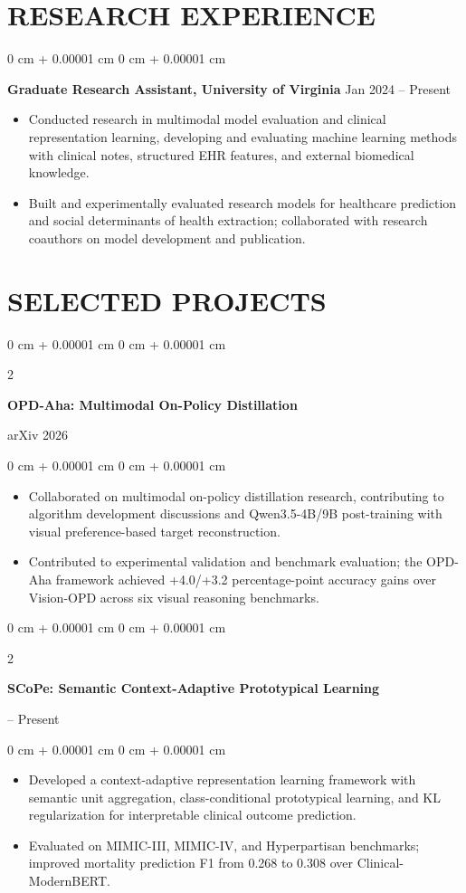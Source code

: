 \documentclass[10pt, letterpaper]{article}
\newenvironment{highlights}{
    \begin{itemize}[
        topsep=0.03 cm,
        parsep=0.03 cm,
        partopsep=0pt,
        itemsep=0pt,
        leftmargin=0 cm + 10pt
    ]
}{
    \end{itemize}
} %
\newenvironment{onecolentry}{
    \begin{adjustwidth}{
        0 cm + 0.00001 cm
    }{
        0 cm + 0.00001 cm
    }
}{
    \end{adjustwidth}
} %
\newenvironment{twocolentry}[2][]{
    \onecolentry
    \def\secondColumn{#2}
    \setcolumnwidth{\fill, 4.5 cm}
    \begin{paracol}{2}
}{
    \switchcolumn \raggedleft \secondColumn
    \end{paracol}
    \endonecolentry
} %
\begin{document}
\section{RESEARCH EXPERIENCE}
\begin{onecolentry}
\textbf{Graduate Research Assistant, University of Virginia} \hfill Jan 2024 -- Present
\begin{highlights}
\item Conducted research in multimodal model evaluation and clinical representation learning, developing and evaluating machine learning methods with clinical notes, structured EHR features, and external biomedical knowledge.
\item Built and experimentally evaluated research models for healthcare prediction and social determinants of health extraction; collaborated with research coauthors on model development and publication.
\end{highlights}
\end{onecolentry}
\section{SELECTED PROJECTS}

\begin{twocolentry}{arXiv 2026}
\textbf{OPD-Aha: Multimodal On-Policy Distillation}
\end{twocolentry}
\begin{onecolentry}
\begin{highlights}
\item Collaborated on multimodal on-policy distillation research, contributing to algorithm development discussions and Qwen3.5-4B/9B post-training with visual preference-based target reconstruction.
\item Contributed to experimental validation and benchmark evaluation; the OPD-Aha framework achieved +4.0/+3.2 percentage-point accuracy gains over Vision-OPD across six visual reasoning benchmarks.
\end{highlights}
\end{onecolentry}
\vspace{0.06 cm}

\begin{twocolentry}{2026 -- Present}
\textbf{SCoPe: Semantic Context-Adaptive Prototypical Learning}
\end{twocolentry}
\begin{onecolentry}
\begin{highlights}
\item Developed a context-adaptive representation learning framework with semantic unit aggregation, class-conditional prototypical learning, and KL regularization for interpretable clinical outcome prediction.
\item Evaluated on MIMIC-III, MIMIC-IV, and Hyperpartisan benchmarks; improved mortality prediction F1 from 0.268 to 0.308 over Clinical-ModernBERT.
\end{highlights}
\end{onecolentry}
\vspace{0.06 cm}
\end{document}
